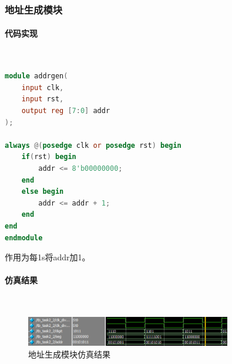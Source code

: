 \documentclass[UTF8]{ctexart}
\newcommand{\subsubsubsection}[1]{\paragraph{#1}\mbox{}\\}
\begin{document}
\subsubsection{地址生成模块}
\subsubsubsection{代码实现}
\begin{framed}
    \begin{lstlisting}[language=verilog,style=verilogStyle]
module addrgen(
    input clk,
    input rst,
    output reg [7:0] addr
);

always @(posedge clk or posedge rst) begin
    if(rst) begin
        addr <= 8'b00000000;
    end
    else begin
        addr <= addr + 1;
    end
end
endmodule
    \end{lstlisting}
\end{framed}
作用为每1s将addr加1。
\subsubsubsection{仿真结果}
\begin{figure}[H]
    \centering
    \includegraphics[width=0.8\textwidth]{task2_2_1}
    \caption{地址生成模块仿真结果}
\end{figure}
\end{document}
